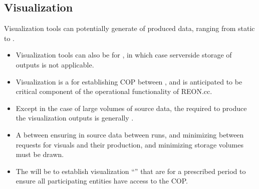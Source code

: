 \documentclass[letterpaper,10pt,english]{sphinxmanual}
\begin{document}
\subsection{Visualization}
\label{\detokenize{requirements/information/visualization:visualization}}\label{\detokenize{requirements/information/visualization::doc}}
\sphinxAtStartPar
Visualization tools can potentially generate  of produced data, ranging from static  to .
\begin{itemize}
\item {} 
\sphinxAtStartPar
Visualization tools can also be  for , in which case server\sphinxhyphen{}side storage of outputs is not applicable.

\item {} 
\sphinxAtStartPar
Visualization is a  for establishing COP between , and is anticipated to be critical component of the operational functionality of REON.cc.

\item {} 
\sphinxAtStartPar
Except in the case of large volumes of source data, the  required to produce the visualization outputs is generally .

\item {} 
\sphinxAtStartPar
A  between ensuring  in source data between runs, and minimizing  between requests for visuals and their production, and minimizing storage volumes must be drawn.

\item {} 
\sphinxAtStartPar
The  will be to establish visualization “” that are  for a prescribed period to ensure all participating entities have access to the COP.

\end{itemize}
\end{document}
